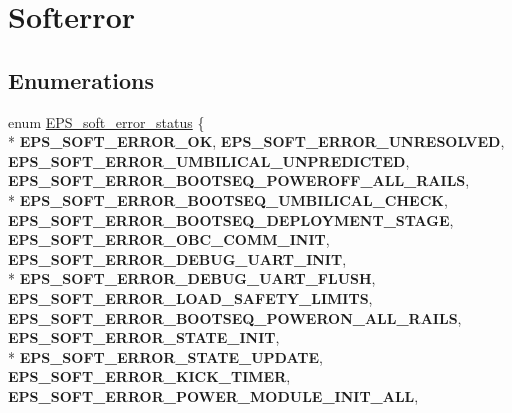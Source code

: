 \hypertarget{group__softerror}{\section{Softerror}
\label{group__softerror}
}
\subsection*{Enumerations}
\begin{DoxyCompactItemize}
\item 
enum \hyperlink{group__softerror_ga82875cd4cc1b94ab7e638961c1b79e08}{E\-P\-S\-\_\-soft\-\_\-error\-\_\-status} \{ \\*
{\bfseries E\-P\-S\-\_\-\-S\-O\-F\-T\-\_\-\-E\-R\-R\-O\-R\-\_\-\-O\-K}, 
{\bfseries E\-P\-S\-\_\-\-S\-O\-F\-T\-\_\-\-E\-R\-R\-O\-R\-\_\-\-U\-N\-R\-E\-S\-O\-L\-V\-E\-D}, 
{\bfseries E\-P\-S\-\_\-\-S\-O\-F\-T\-\_\-\-E\-R\-R\-O\-R\-\_\-\-U\-M\-B\-I\-L\-I\-C\-A\-L\-\_\-\-U\-N\-P\-R\-E\-D\-I\-C\-T\-E\-D}, 
{\bfseries E\-P\-S\-\_\-\-S\-O\-F\-T\-\_\-\-E\-R\-R\-O\-R\-\_\-\-B\-O\-O\-T\-S\-E\-Q\-\_\-\-P\-O\-W\-E\-R\-O\-F\-F\-\_\-\-A\-L\-L\-\_\-\-R\-A\-I\-L\-S}, 
\\*
{\bfseries E\-P\-S\-\_\-\-S\-O\-F\-T\-\_\-\-E\-R\-R\-O\-R\-\_\-\-B\-O\-O\-T\-S\-E\-Q\-\_\-\-U\-M\-B\-I\-L\-I\-C\-A\-L\-\_\-\-C\-H\-E\-C\-K}, 
{\bfseries E\-P\-S\-\_\-\-S\-O\-F\-T\-\_\-\-E\-R\-R\-O\-R\-\_\-\-B\-O\-O\-T\-S\-E\-Q\-\_\-\-D\-E\-P\-L\-O\-Y\-M\-E\-N\-T\-\_\-\-S\-T\-A\-G\-E}, 
{\bfseries E\-P\-S\-\_\-\-S\-O\-F\-T\-\_\-\-E\-R\-R\-O\-R\-\_\-\-O\-B\-C\-\_\-\-C\-O\-M\-M\-\_\-\-I\-N\-I\-T}, 
{\bfseries E\-P\-S\-\_\-\-S\-O\-F\-T\-\_\-\-E\-R\-R\-O\-R\-\_\-\-D\-E\-B\-U\-G\-\_\-\-U\-A\-R\-T\-\_\-\-I\-N\-I\-T}, 
\\*
{\bfseries E\-P\-S\-\_\-\-S\-O\-F\-T\-\_\-\-E\-R\-R\-O\-R\-\_\-\-D\-E\-B\-U\-G\-\_\-\-U\-A\-R\-T\-\_\-\-F\-L\-U\-S\-H}, 
{\bfseries E\-P\-S\-\_\-\-S\-O\-F\-T\-\_\-\-E\-R\-R\-O\-R\-\_\-\-L\-O\-A\-D\-\_\-\-S\-A\-F\-E\-T\-Y\-\_\-\-L\-I\-M\-I\-T\-S}, 
{\bfseries E\-P\-S\-\_\-\-S\-O\-F\-T\-\_\-\-E\-R\-R\-O\-R\-\_\-\-B\-O\-O\-T\-S\-E\-Q\-\_\-\-P\-O\-W\-E\-R\-O\-N\-\_\-\-A\-L\-L\-\_\-\-R\-A\-I\-L\-S}, 
{\bfseries E\-P\-S\-\_\-\-S\-O\-F\-T\-\_\-\-E\-R\-R\-O\-R\-\_\-\-S\-T\-A\-T\-E\-\_\-\-I\-N\-I\-T}, 
\\*
{\bfseries E\-P\-S\-\_\-\-S\-O\-F\-T\-\_\-\-E\-R\-R\-O\-R\-\_\-\-S\-T\-A\-T\-E\-\_\-\-U\-P\-D\-A\-T\-E}, 
{\bfseries E\-P\-S\-\_\-\-S\-O\-F\-T\-\_\-\-E\-R\-R\-O\-R\-\_\-\-K\-I\-C\-K\-\_\-\-T\-I\-M\-E\-R}, 
{\bfseries E\-P\-S\-\_\-\-S\-O\-F\-T\-\_\-\-E\-R\-R\-O\-R\-\_\-\-P\-O\-W\-E\-R\-\_\-\-M\-O\-D\-U\-L\-E\-\_\-\-I\-N\-I\-T\-\_\-\-A\-L\-L}, 

\end{DoxyCompactItemize}
